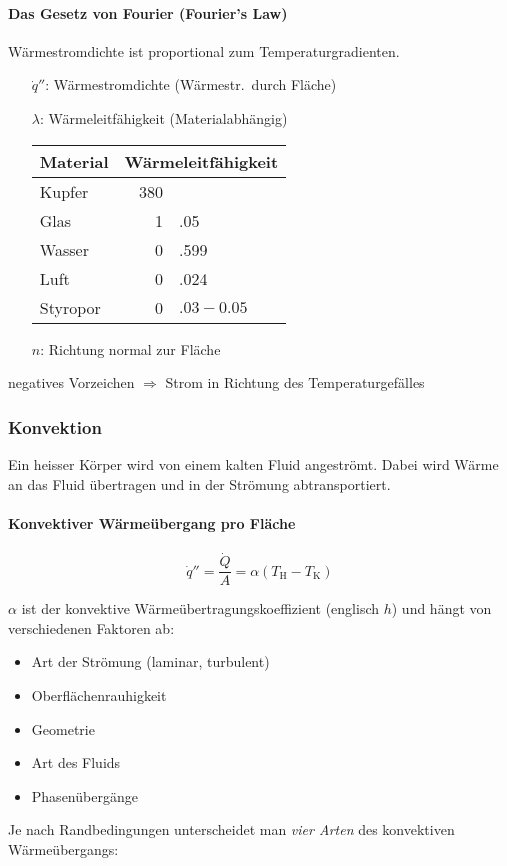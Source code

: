 		\paragraph{Das Gesetz von Fourier (Fourier's Law)} %
			Wärmestromdichte ist proportional zum Temperaturgradienten.
			\begin{itemize}
				\item[$\dot q''$:] Wärmestromdichte (Wärmestr.~durch Fläche) \niceunit{\watt\per\metre\squared}
				\item[$\lambda$:] Wärmeleitfähigkeit (Materialabhängig) \niceunit{\watt\per\metre\per\kelvin}
					\begin{center}
						\begin{tabular}{l|r@{}l}
							\textbf{Material} & \multicolumn{2}{l}{\textbf{Wärmeleitfähigkeit} \niceunit{\watt\per\metre\per\kelvin}} \\
							\midrule
							Kupfer & 380 & \\
							Glas & 1&.05 \\
							Wasser & 0&.599 \\
							Luft & 0&.024 \\
							Styropor & 0&$.03 - 0.05$
						\end{tabular}
					\end{center}
				\item[$n$:] Richtung normal zur Fläche
			\end{itemize}
			
			negatives Vorzeichen $\Rightarrow$ Strom in Richtung des Temperaturgefälles
		\subsubsection{Konvektion} %
			Ein heisser Körper wird von einem kalten Fluid angeströmt. Dabei wird Wärme an
			das Fluid übertragen und in der Strömung abtransportiert.
			
			\paragraph{Konvektiver Wärmeübergang pro Fläche} %
				\begin{equation*}
					\dot q'' = \frac{\dot{Q}}{A} = \alpha (T_\text{H} - T_\text{K})
				\end{equation*}
				
				$\alpha$ ist der konvektive Wärmeübertragungskoeffizient (englisch $h$) und hängt von verschiedenen Faktoren ab:
				\begin{itemize}
					\item Art der Strömung (laminar, turbulent)
					\item Oberflächenrauhigkeit
					\item Geometrie
					\item Art des Fluids
					\item Phasenübergänge
				\end{itemize}
			Je nach Randbedingungen unterscheidet man \emph{vier Arten} des konvektiven Wärmeübergangs:
			
